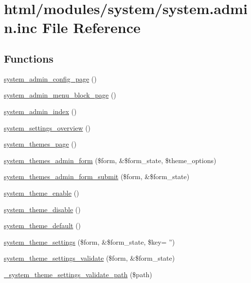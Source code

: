 \hypertarget{system_8admin_8inc}{
\section{html/modules/system/system.admin.inc File Reference}
\label{system_8admin_8inc}
}
\subsection*{Functions}
\begin{DoxyCompactItemize}
\item 
\hyperlink{system_8admin_8inc_a5da84f893a839fab8b3d748ecb52de9d}{system\_\-admin\_\-config\_\-page} ()
\item 
\hyperlink{system_8admin_8inc_ade03d94c63a6cce2148fc06982f510cb}{system\_\-admin\_\-menu\_\-block\_\-page} ()
\item 
\hyperlink{system_8admin_8inc_a89bec592ed801dd4eb6f50c450e4d54e}{system\_\-admin\_\-index} ()
\item 
\hyperlink{system_8admin_8inc_a8f7e131c5d7173602739c67ef91093de}{system\_\-settings\_\-overview} ()
\item 
\hyperlink{system_8admin_8inc_a4e0d7dd2d258e827cc3195b95151cd59}{system\_\-themes\_\-page} ()
\item 
\hyperlink{group__forms_gad1993e041cd4138670f61859507ba9ac}{system\_\-themes\_\-admin\_\-form} (\$form, \&\$form\_\-state, \$theme\_\-options)
\item 
\hyperlink{system_8admin_8inc_a9076bd2c2f4ed726578e88c4419785fe}{system\_\-themes\_\-admin\_\-form\_\-submit} (\$form, \&\$form\_\-state)
\item 
\hyperlink{system_8admin_8inc_ad430bc3a50505142539601f4f7ba25e0}{system\_\-theme\_\-enable} ()
\item 
\hyperlink{system_8admin_8inc_a3abc909740cb59ed14500cc93a519ad8}{system\_\-theme\_\-disable} ()
\item 
\hyperlink{system_8admin_8inc_a3beefeae869b24502316eb523364ebca}{system\_\-theme\_\-default} ()
\item 
\hyperlink{group__forms_ga5b2e00be741c5eae4eb1e56c862a68d5}{system\_\-theme\_\-settings} (\$form, \&\$form\_\-state, \$key= '')
\item 
\hyperlink{system_8admin_8inc_a9e7a668607f5bc611d7daedaa666797e}{system\_\-theme\_\-settings\_\-validate} (\$form, \&\$form\_\-state)
\item 
\hyperlink{system_8admin_8inc_a6e0c509f421fa31a359aa17523d26c04}{\_\-system\_\-theme\_\-settings\_\-validate\_\-path} (\$path)

\end{DoxyCompactItemize}

